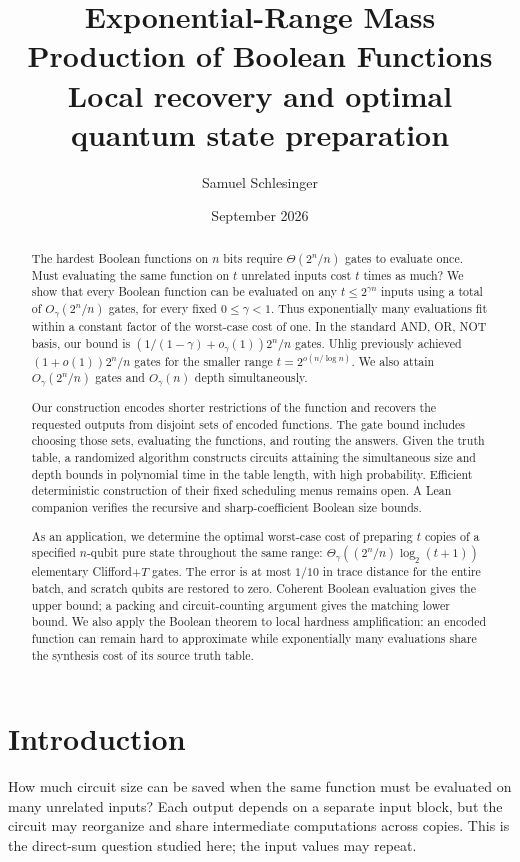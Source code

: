 \documentclass[11pt]{article}
\title{\textbf{Exponential-Range Mass Production of Boolean Functions}\\[0.35em]
\large Local recovery and optimal quantum state preparation}
\author{}
\date{}
\author{Samuel Schlesinger}
\date{September 2026}
\begin{document}
\maketitle

\begin{abstract}
The hardest Boolean functions on $n$ bits require $\Theta(2^n/n)$ gates
to evaluate once.  Must evaluating the same function on $t$ unrelated
inputs cost $t$ times as much?  We show that every Boolean function can
be evaluated on any $t\le2^{\gamma n}$ inputs using a total of
$O_\gamma(2^n/n)$ gates, for every fixed $0\le\gamma<1$.
Thus exponentially many evaluations fit within a constant factor of the
worst-case cost of one.  In the standard AND, OR, NOT basis, our bound
is $(1/(1-\gamma)+o_\gamma(1))2^n/n$ gates.  Uhlig previously achieved
$(1+o(1))2^n/n$ gates for the smaller range $t=2^{o(n/\log n)}$.
We also attain $O_\gamma(2^n/n)$ gates and $O_\gamma(n)$ depth
simultaneously.

Our construction encodes shorter restrictions of the function and recovers
the requested outputs from disjoint sets of encoded functions.  The gate
bound includes choosing those sets, evaluating the functions, and routing
the answers.  Given the truth table, a randomized algorithm constructs
circuits attaining the simultaneous size and depth bounds in polynomial
time in the table length, with high probability.  Efficient deterministic
construction of their fixed scheduling menus remains open.  A Lean
companion verifies the recursive and sharp-coefficient Boolean size bounds.

As an application, we determine the optimal worst-case cost of preparing
$t$ copies of a specified $n$-qubit pure state throughout the same range:
$\Theta_\gamma((2^n/n)\log_2(t+1))$ elementary Clifford+$T$ gates.
The error is at most $1/10$ in trace distance for the entire batch, and
scratch qubits are restored to zero.  Coherent Boolean evaluation gives
the upper bound; a packing and circuit-counting argument gives the
matching lower bound.
We also apply the Boolean theorem to local hardness amplification:
an encoded function can remain hard to approximate while exponentially
many evaluations share the synthesis cost of its source truth table.
\end{abstract}

\section{Introduction}

How much circuit size can be saved when the same function must be evaluated on
many unrelated inputs?  Each output depends on a separate input block, but
the circuit may reorganize and share intermediate computations across copies.
This is the direct-sum question studied here; the input values may repeat.
\end{document}
